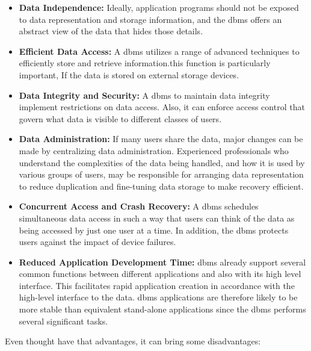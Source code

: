 \begin{itemize}
\item {\textbf{Data Independence:}} Ideally, application programs should not be exposed to data representation and storage information, and the \gls{dbms} offers an abstract view of the data that hides those details.

\item{\textbf{Efficient Data Access:}}
A \gls{dbms} utilizes a range of advanced techniques to efficiently store and retrieve information.this function is particularly important, If the data is stored on external storage devices.

\item{\textbf{Data Integrity and Security:}}  A \gls{dbms} to maintain data integrity implement restrictions on data access. Also, it can enforce access control that govern what data is visible to different classes of users.

\item{\textbf{Data Administration:}} If many users share the data, major changes can be made by centralizing data administration. Experienced professionals who understand the complexities of the data being handled, and how it is used by various groups of users, may be responsible for arranging data representation to reduce duplication and fine-tuning data storage to make recovery efficient.

\item{\textbf{Concurrent Access and Crash Recovery:}} A \gls{dbms} schedules simultaneous data access in such a way that users can think of the data as being accessed by just one user at a time. In addition, the \gls{dbms} protects users against the impact of device failures.

\item{\textbf{Reduced Application Development Time:}} 
\gls{dbms} already support several common functions between different applications and also with its high level interface. This facilitates rapid application creation in accordance with the high-level interface to the data. \gls{dbms} applications are therefore likely to be more stable than equivalent stand-alone applications since the \gls{dbms} performs several significant tasks.
\end{itemize}

Even thought have that advantages, it can bring some disadvantages:

